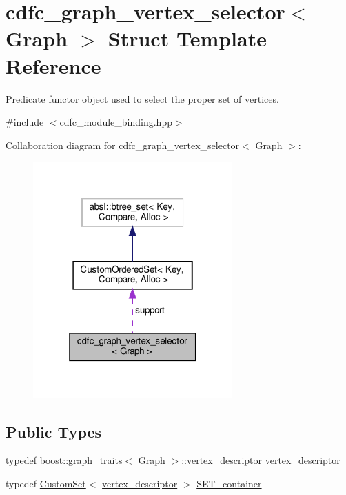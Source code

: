 \hypertarget{structcdfc__graph__vertex__selector}{}\section{cdfc\+\_\+graph\+\_\+vertex\+\_\+selector$<$ Graph $>$ Struct Template Reference}
\label{structcdfc__graph__vertex__selector}


Predicate functor object used to select the proper set of vertices.  




{\ttfamily \#include $<$cdfc\+\_\+module\+\_\+binding.\+hpp$>$}



Collaboration diagram for cdfc\+\_\+graph\+\_\+vertex\+\_\+selector$<$ Graph $>$\+:
\nopagebreak
\begin{figure}[H]
\begin{center}
\leavevmode
\includegraphics[width=217pt]{d8/d65/structcdfc__graph__vertex__selector__coll__graph}
\end{center}
\end{figure}
\subsection*{Public Types}
\begin{DoxyCompactItemize}
\item 
typedef boost\+::graph\+\_\+traits$<$ \hyperlink{structGraph}{Graph} $>$\+::\hyperlink{structcdfc__graph__vertex__selector_a4cafbcfc2a2a46718e5a8330b56398fb}{vertex\+\_\+descriptor} \hyperlink{structcdfc__graph__vertex__selector_a4cafbcfc2a2a46718e5a8330b56398fb}{vertex\+\_\+descriptor}
\item 
typedef \hyperlink{custom__set_8hpp_a615bc2f42fc38a4bb1790d12c759e86f}{Custom\+Set}$<$ \hyperlink{structcdfc__graph__vertex__selector_a4cafbcfc2a2a46718e5a8330b56398fb}{vertex\+\_\+descriptor} $>$ \hyperlink{structcdfc__graph__vertex__selector_a4eabaf16609aadaa7ed6bcb236d82950}{S\+E\+T\+\_\+container}
\end{DoxyCompactItemize}
